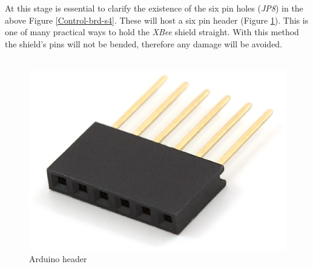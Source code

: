 \documentclass[12pt,a4paper,draft]{report}
\begin{document}
At this stage is essential to clarify the existence of the six pin holes (\textit{JP8}) in the above Figure \ref{Control-brd-s4}.
These will host a six pin header (Figure \ref{Arduino_header}).
This is one of many practical ways to hold the \textit{XBee} shield straight.
With this method the shield's pins will not be bended, therefore any damage will be avoided.\\
\ \\
\begin{figure}[H]
\centering
\includegraphics*[scale=0.25]{arduino_header}
\caption{Arduino header}
\label{Arduino_header}
\end{figure}
%
\end{document}
